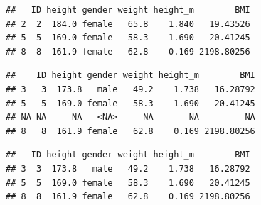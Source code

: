 \documentclass[
]{book}
\newenvironment{Shaded}{\begin{snugshade}}{\end{snugshade}}
\newcommand{\CommentTok}[1]{\textcolor[rgb]{0.56,0.35,0.01}{\textit{#1}}}
\newcommand{\DecValTok}[1]{\textcolor[rgb]{0.00,0.00,0.81}{#1}}
\newcommand{\FunctionTok}[1]{\textcolor[rgb]{0.00,0.00,0.00}{#1}}
\newcommand{\NormalTok}[1]{#1}
\newcommand{\SpecialCharTok}[1]{\textcolor[rgb]{0.00,0.00,0.00}{#1}}
\newcommand{\StringTok}[1]{\textcolor[rgb]{0.31,0.60,0.02}{#1}}
\begin{document}
\begin{verbatim}
##   ID height gender weight height_m        BMI
## 2  2  184.0 female   65.8    1.840   19.43526
## 5  5  169.0 female   58.3    1.690   20.41245
## 8  8  161.9 female   62.8    0.169 2198.80256
\end{verbatim}

\begin{Shaded}
\end{Shaded}

\begin{verbatim}
##    ID height gender weight height_m        BMI
## 3   3  173.8   male   49.2    1.738   16.28792
## 5   5  169.0 female   58.3    1.690   20.41245
## NA NA     NA   <NA>     NA       NA         NA
## 8   8  161.9 female   62.8    0.169 2198.80256
\end{verbatim}

\begin{Shaded}
\end{Shaded}

\begin{verbatim}
##   ID height gender weight height_m        BMI
## 3  3  173.8   male   49.2    1.738   16.28792
## 5  5  169.0 female   58.3    1.690   20.41245
## 8  8  161.9 female   62.8    0.169 2198.80256
\end{verbatim}

\begin{Shaded}
\end{Shaded}
\end{document}
